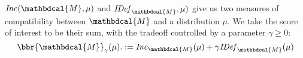 \documentclass{article}
\theoremstyle{plain}
\theoremstyle{definition}
\theoremstyle{remark}
\newcommand{\thickD}{I\mkern-8muD}
\newcommand{\kldiv}{\thickD\infdivx}
\let\H\relax
\DeclareMathOperator{\H}{\mathrm{H}} %
\DeclareMathOperator*{\E}{\mathbb{E}} %
\newcommand\mat[1]{\mathbf{#1}}
\newcommand\numberthis{\addtocounter{equation}{1}\tag{\theequation}}
\def\sheq{\!=\!}
\newcommand{\bp}[1][L]{\mat{p}_{\!_{#1}\!}}
\newcommand{\Ed}{\mathcal E}
\newcommand{\dg}[1]{\mathbdcal{#1}}
\newcommand{\IBal}[1]{\mathit{IDef}_{#1}}
\newcommand\extrainfo[2][\dg M]{\IBal[#1](#2)}
\newcommand\Inc{\mathit{Inc}}
\numberwithin{equation}{section}
\begin{document}
$\Inc({\dg M}, \mu)$ and $\IBal{\dg M},\mu)$ give us two measures
of compatibility between ${\dg M}$ and a distribution $\mu$.
We take the score of interest to be their sum, with the tradeoff
        controlled by a parameter $\gamma \ge 0$:
        \begin{equation}
          	  \bbr{\dg M}_\gamma(\mu).
	 := \Inc_{\dg M}(\mu) + \gamma \IBal{\dg M}(\mu)
                \label{eqn:full-score}
    	\end{equation}
\end{document}
